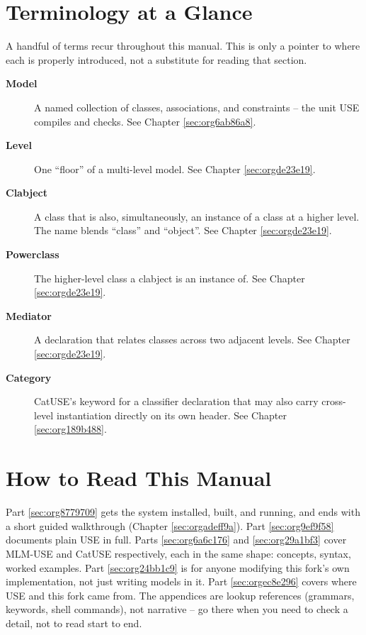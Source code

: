 \documentclass[11pt,twoside,a4paper]{book}
\begin{document}
\section{Terminology at a Glance}
\label{sec:org80f9f29}
A handful of terms recur throughout this manual. This is only a
pointer to where each is properly introduced, not a substitute for
reading that section.


\begin{description}
\item[{\textbf{Model}}] A named collection of classes, associations, and
constraints -- the unit USE compiles and checks. See Chapter
\ref{sec:org6ab86a8}.
\item[{\textbf{Level}}] One ``floor'' of a multi-level model. See Chapter
\ref{sec:orgde23e19}.
\item[{\textbf{Clabject}}] A class that is also, simultaneously, an instance of a
class at a higher level. The name blends ``class'' and ``object''. See
Chapter \ref{sec:orgde23e19}.
\item[{\textbf{Powerclass}}] The higher-level class a clabject is an instance of.
See Chapter \ref{sec:orgde23e19}.
\item[{\textbf{Mediator}}] A declaration that relates classes across two adjacent
levels. See Chapter \ref{sec:orgde23e19}.
\item[{\textbf{Category}}] CatUSE's keyword for a classifier declaration that may
also carry cross-level instantiation directly on its own header. See
Chapter \ref{sec:org189b488}.
\end{description}

\section{How to Read This Manual}
\label{sec:org40a8231}
Part \ref{sec:org8779709} gets the system installed, built, and
running, and ends with a short guided walkthrough (Chapter
\ref{sec:orgadeff9a}). Part \ref{sec:org9ef9f58} documents plain
USE in full. Parts \ref{sec:org6a6c176} and \ref{sec:org29a1bf3} cover MLM-USE
and CatUSE respectively, each in the same shape: concepts, syntax,
worked examples. Part \ref{sec:org24bb1c9} is for anyone modifying this
fork's own implementation, not just writing models in it. Part
\ref{sec:orgec8e296} covers where USE and this fork came from. The
appendices are lookup references (grammars, keywords, shell commands),
not narrative -- go there when you need to check a detail, not to read
start to end.
\end{document}
